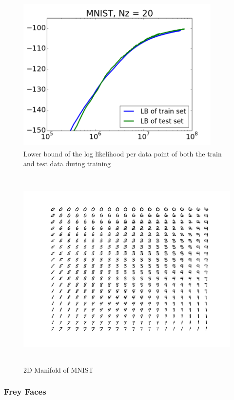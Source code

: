 \documentclass{article}
\begin{document}
\begin{figure}[htb]
\begin{center}
\includegraphics[height=3.1in,width=4in]{lowerboundAEVBMNIST.png}
\caption{Lower bound of the log likelihood per data point of both the train and test data during training}
\end{center}
\end{figure}

\begin{figure}[htb]
\begin{center}
\includegraphics[height=4in,width=5in]{manifoldMNIST.png}
\caption{2D Manifold of MNIST}
\end{center}
\end{figure}

\subsubsection{Frey Faces}
\end{document}
